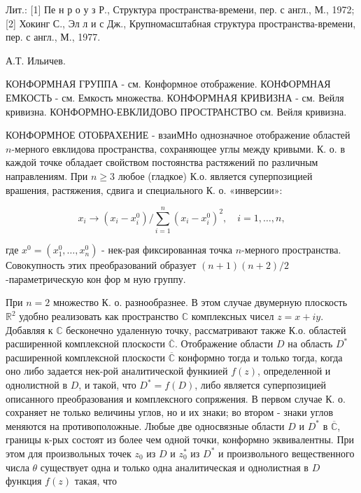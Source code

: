 \documentclass[10pt]{article}
\begin{document}
Лит.: [1] Пе н р о у з Р., Структура пространства-времени, пер. с англ., М., 1972; [2] Хокинг С., Эл л и с Дж., Крупномасштабная структура пространства-времени, пер. с англ., М., 1977.



А.Т. Ильичев.



КОНФОРМНАЯ ГРУППА - см. Конформное отображение. КОНФОРМНАЯ ЕМКОСТЬ - см. Емкость множества. КОНФОРМНАЯ КРИВИЗНА - см. Вейля кривизна. КОНФОРМНО-ЕВКЛИДОВО ПРОСТРАНСТВО см. Вейля кривизна.



КОНФОРМНОЕ ОТОБРАХЕНИЕ - взаиМНо однозначное отображение областей $n$-мерного евклидова пространства, сохраняющее углы между кривыми. К. о. в каждой точке обладает свойством постоянства растяжений по различным направлениям. При $n \geqslant 3$ любое (гладкое) К.о. является суперпозицией врашения, растяжения, сдвига и специального К. о. «инверсии»:



\[

x_{i} \rightarrow\left(x_{i}-x_{i}^{0}\right) / \sum_{i=1}^{n}\left(x_{i}-x_{i}^{0}\right)^{2}, \quad i=1, \ldots, n,

\]



где $x^{0}=\left(x_{1}^{0}, \ldots, x_{n}^{0}\right)$ - нек-рая фиксированная точка $n$-мерного пространства. Совокупность этих преобразований образует $(n+1)(n+2) / 2$-параметрическую кон фор м ную группу.



При $n=2$ множество К. о. разнообразнее. В этом случае двумерную плоскость $\mathbb{R}^{2}$ удобно реализовать как пространство $\mathbb{C}$ комплексных чисел $z=x+i y$. Добавляя к $\mathbb{C}$ бесконечно удаленную точку, рассматривают также К.о. областей расширенной комплексной плоскости $\overline{\mathbb{C}}$. Отображение области $D$ на область $D^{*}$ расширенной комплексной плоскости $\overline{\mathbb{C}}$ конформно тогда и только тогда, когда оно либо задается нек-рой аналитической функиией $f(z)$, определенной и однолистной в $D$, и такой, что $D^{*}=f(D)$, либо является суперпозицией описанного преобразования и комплексного сопряжения. В первом случае К. о. сохраняет не только величины углов, но и их знаки; во втором - знаки углов меняются на противоположные. Любые две односвязные области $D$ и $D^{*}$ в $\overline{\mathbb{C}}$, границы к-рых состоят из более чем одной точки, конформно эквивалентны. При этом для произвольных точек $z_{0}$ из $D$ и $z_{0}^{*}$ из $D^{*}$ и произвольного вещественного числа $\theta$ существует одна и только одна аналитическая и однолистная в $D$ функция $f(z)$ такая, что
\end{document}
